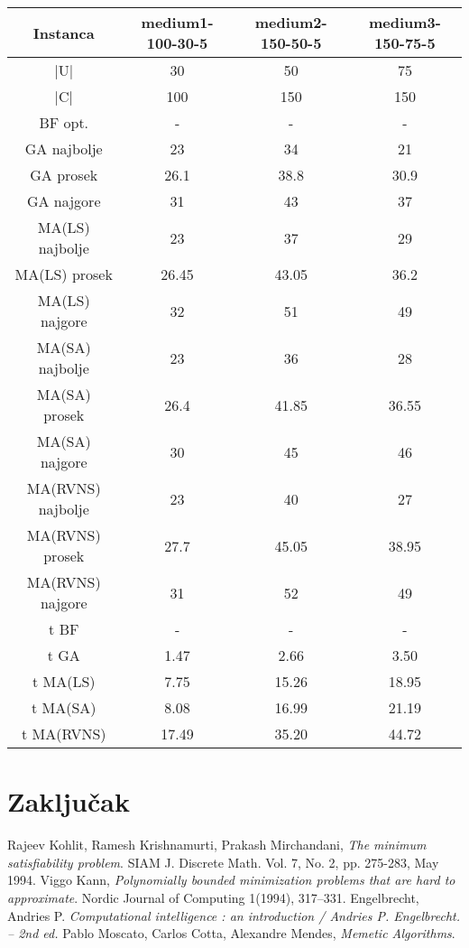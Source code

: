 \documentclass[12pt, a4paper]{article}
\theoremstyle{definition}
\begin{document}
\begin{table}
\begin{adjustbox}{width=\columnwidth,center}
\begin{tabular}{ |c|c|c|c| }
\hline
Instanca & medium1-100-30-5 & medium2-150-50-5 & medium3-150-75-5 \\
\hline
|U| & 30 & 50 & 75 \\
\hline
|C| & 100 & 150 & 150 \\
\hline
BF opt. & - & - & - \\
\hline
GA najbolje & 23 & 34 & 21 \\
\hline
GA prosek & 26.1 & 38.8 & 30.9 \\
\hline
GA najgore & 31 & 43 & 37 \\
\hline
MA(LS) najbolje & 23 & 37 & 29 \\
\hline
MA(LS) prosek & 26.45 & 43.05 & 36.2 \\
\hline
MA(LS) najgore & 32 & 51 & 49 \\
\hline
MA(SA) najbolje & 23 & 36 & 28 \\
\hline
MA(SA) prosek & 26.4 & 41.85 & 36.55 \\
\hline
MA(SA) najgore & 30 & 45 & 46 \\
\hline
MA(RVNS) najbolje & 23 & 40 & 27 \\
\hline
MA(RVNS) prosek & 27.7 & 45.05 & 38.95 \\
\hline
MA(RVNS) najgore & 31 & 52 & 49 \\
\hline
t BF & - & - & - \\
\hline
t GA & 1.47 & 2.66 & 3.50 \\
\hline
t MA(LS) & 7.75 & 15.26 & 18.95 \\
\hline
t MA(SA) & 8.08 & 16.99 & 21.19 \\
\hline
t MA(RVNS) & 17.49 & 35.20 & 44.72 \\
\hline
\end{tabular}
\end{adjustbox}
\end{table}

\section{Zaključak}

\newpage

\begin{thebibliography}{9}
Rajeev Kohlit, Ramesh Krishnamurti, Prakash Mirchandani, \emph{The minimum satisfiability problem}. SIAM J. Discrete Math. Vol. 7, No. 2, pp. 275-283, May 1994.
Viggo Kann, \emph{Polynomially bounded minimization problems that are hard to approximate}. Nordic Journal of Computing 1(1994), 317–331.
Engelbrecht, Andries P. \emph{Computational intelligence : an introduction / Andries P. Engelbrecht. – 2nd ed.}
Pablo Moscato, Carlos Cotta, Alexandre Mendes, \emph{Memetic Algorithms}. 
\end{thebibliography}
\end{document}
